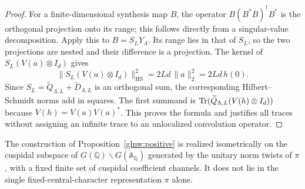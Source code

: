 \begin{proof}
For a finite-dimensional synthesis map $B$, the operator
$B(B^*B)^\dagger B^*$ is the orthogonal projection onto its range;
this follows directly from a singular-value decomposition.
Apply this to $B=S_LY_\Lambda$. Its range lies in that of $S_L$,
so the two projections are nested and their difference is a
projection. The kernel of $S_L(V(a)\otimes I_d)$ gives
\[
 \|S_L(V(a)\otimes I_d)\|_{\mathrm{HS}}^2
        =2Ld\,\|a\|_2^2=2Ld\,h(0).
\]
Since $S_L=\widetilde Q_{\Lambda,L}+\widetilde D_{\Lambda,L}$
is an orthogonal sum, the corresponding Hilbert--Schmidt norms
add in squares. The first summand is
$\operatorname{Tr}(\widetilde Q_{\Lambda,L}(V(h)\otimes I_d))$ because
$V(h)=V(a)V(a)^*$. This proves the formula and justifies all
traces without assigning an infinite trace to an unlocalized
convolution operator.
\end{proof}

\begin{proposition}
\label{glnw:quotient}
The construction of Proposition~\ref{glnw:positive} is realized
isometrically on the cuspidal subspace of
$G(\mathbb Q)\backslash G(\mathbb A_\mathbb Q)$ generated by the
unitary norm twists of $\pi$, with a fixed finite set of
cuspidal coefficient channels. It does not lie in the single
fixed-central-character representation $\pi$ alone.
\end{proposition}

